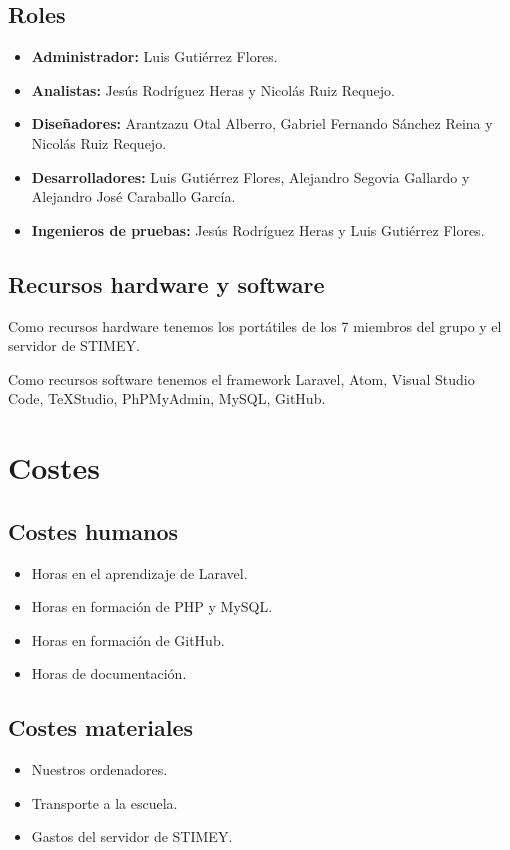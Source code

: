 \subsection{Roles}
\begin{itemize}
	\item \textbf{Administrador:} Luis Gutiérrez Flores.
	\item \textbf{Analistas:} Jesús Rodríguez Heras y Nicolás Ruiz Requejo.
	\item \textbf{Diseñadores:} Arantzazu Otal Alberro, Gabriel Fernando Sánchez Reina y Nicolás Ruiz Requejo.
	\item \textbf{Desarrolladores:} Luis Gutiérrez Flores, Alejandro Segovia Gallardo y Alejandro José Caraballo García.
	\item \textbf{Ingenieros de pruebas:} Jesús Rodríguez Heras y Luis Gutiérrez Flores.
\end{itemize}

\subsection{Recursos hardware y software}
Como recursos hardware tenemos los portátiles de los 7 miembros del grupo y el servidor de STIMEY.

Como recursos software tenemos el framework Laravel, Atom, Visual Studio Code, TeXStudio, PhPMyAdmin, MySQL, GitHub.

\section{Costes}
\subsection{Costes humanos}
\begin{itemize}
	\item Horas en el aprendizaje de Laravel.
	\item Horas en formación de PHP y MySQL.
	\item Horas en formación de GitHub.
	\item Horas de documentación.
\end{itemize}

\subsection{Costes materiales}
\begin{itemize}
	\item Nuestros ordenadores.
	\item Transporte a la escuela.
	\item Gastos del servidor de STIMEY.
\end{itemize}

